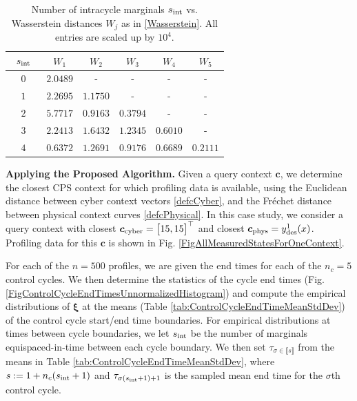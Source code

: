 \documentclass[letterpaper, 10pt, twocolumn]{ieeeconf}      %
\begin{document}
\begin{table}[h]
\centering
\begin{tabular}{| c | c | c | c | c | c |} 
 \hline
 ~$s_{\rm{int}}$~ & ~$W_{1}$~ & ~$W_{2}$~ & ~$W_{3}$~ & ~$W_{4}$~ & ~$W_{5}$~\\
 \hline\hline
 $0$ & $2.0489$ & - & - & - & - \\
 \hline
 $1$ & $2.2695$ & $1.1750$ & - & - & - \\
 \hline
 $2$ & $5.7717$ & $0.9163$ & $0.3794$ & - & - \\
 \hline
 $3$ & $2.2413$ & $1.6432$ & $1.2345$ & $0.6010$ & -  \\
\hline
 $4$ & $0.6372$ & $1.2691$ & $0.9176$ & $0.6689$ & $0.2111$ \\
\hline
\end{tabular}
\caption{{\small{Number of intracycle marginals $s_{\rm{int}}$ vs. Wasserstein distances $W_{j}$ as in \eqref{Wasserstein}. All entries are scaled up by $10^{4}$.}}}
\label{tab:WassersteinErrorsVaryingSint}
\vspace*{-0.2in}
\end{table}









\noindent \textbf{Applying the Proposed Algorithm.} Given a query context $\bm{c}$, we determine the closest CPS context for which profiling data is available, using the Euclidean distance between cyber context vectors \eqref{defcCyber}, and the Fr\'echet distance \cite{Eiter1994ComputingDF} between physical context curves \eqref{defcPhysical}. In this case study, we consider a query context with closest $\bm{c}_{\rm{cyber}}=\begin{bmatrix} 15, 15\end{bmatrix}^\top$ and closest $\bm{c}_{\rm{phys}}=y_{\rm{des}}^1(x)$. Profiling data for this $\bm{c}$ is shown in Fig. \ref{FigAllMeasuredStatesForOneContext}.

For each of the $n=500$ profiles, we are given the end times for each of the $n_{c}=5$ control cycles. We then determine the statistics of the cycle end times (Fig. \ref{FigControlCycleEndTimesUnnormalizedHistogram}) and compute the empirical distributions of $\bm{\xi}$ at the means (Table \ref{tab:ControlCycleEndTimeMeanStdDev}) of the control cycle start/end time boundaries. For empirical distributions at times between cycle boundaries, we let $s_{\rm{int}}$ be the number of marginals equispaced-in-time between each cycle boundary. We then set $\tau_{\sigma\in\llbracket s\rrbracket}$ from the means in Table \ref{tab:ControlCycleEndTimeMeanStdDev}, where $s:=1+n_c(s_{\rm{int}}+1)$ and $\tau_{\sigma(s_{\rm{int}}+1)+1}$ is the sampled mean end time for the $\sigma$th control cycle.
\end{document}
